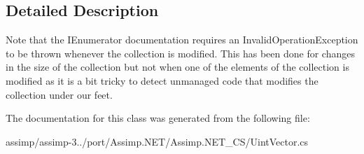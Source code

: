 \subsection{Detailed Description}
Note that the I\+Enumerator documentation requires an Invalid\+Operation\+Exception to be thrown whenever the collection is modified. This has been done for changes in the size of the collection but not when one of the elements of the collection is modified as it is a bit tricky to detect unmanaged code that modifies the collection under our feet. 

The documentation for this class was generated from the following file\+:\begin{DoxyCompactItemize}
\item 
assimp/assimp-\/3../port/\+Assimp.\+N\+E\+T/\+Assimp.\+N\+E\+T\+\_\+\+C\+S/Uint\+Vector.\+cs\end{DoxyCompactItemize}
